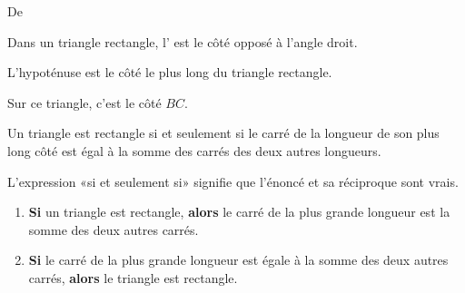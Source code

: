 

De \cite{NRHooXFvgpp4}

\begin{definition}
    Dans un triangle rectangle, l' est le côté opposé à l'angle droit.
\end{definition}
\begin{remark}
    L'hypoténuse est le côté le plus long du triangle rectangle.
\end{remark}

\begin{example}
    Sur ce triangle, c'est le côté \( BC\).
    \begin{center}
        
    \end{center}
\end{example}



\begin{theorem}[de Pythagore]
    Un triangle est rectangle si et seulement si le carré de la longueur de son plus long côté est égal à la somme des carrés des deux autres longueurs.
\end{theorem}

\begin{remark}
    L'expression «si et seulement si» signifie que l'énoncé et sa réciproque sont vrais.
    \begin{enumerate}
        \item
            {\bf Si} un triangle est rectangle, {\bf alors} le carré de la plus grande longueur est la somme des deux autres carrés.
        \item
            {\bf Si} le carré de la plus grande longueur est égale à la somme des deux autres carrés, {\bf alors} le triangle est rectangle.
    \end{enumerate}
\end{remark}

